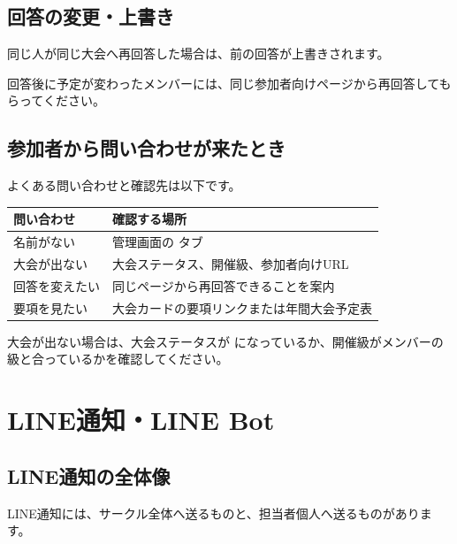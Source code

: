 \documentclass[a4paper,11pt]{ltjsarticle}
\newcommand{\code}[1]{\tcbox[
  on line,
  boxsep=0.3mm,
  left=0.7mm,
  right=0.7mm,
  top=0.2mm,
  bottom=0.2mm,
  arc=0.7mm,
  colback=soft,
  colframe=soft
]{\ttfamily\small #1}}
\begin{document}
\subsection{回答の変更・上書き}

同じ人が同じ大会へ再回答した場合は、前の回答が上書きされます。

回答後に予定が変わったメンバーには、同じ参加者向けページから再回答してもらってください。

\subsection{参加者から問い合わせが来たとき}

よくある問い合わせと確認先は以下です。

\renewcommand{\arraystretch}{1.25}
\begin{tabularx}{\linewidth}{>{\raggedright\arraybackslash}X>{\raggedright\arraybackslash}X}
\toprule
\rowcolor{tablehead}
\textbf{問い合わせ} & \textbf{確認する場所} \\ \midrule
名前がない & 管理画面の \code{メンバー} タブ \\
大会が出ない & 大会ステータス、開催級、参加者向けURL \\
回答を変えたい & 同じページから再回答できることを案内 \\
要項を見たい & 大会カードの要項リンクまたは年間大会予定表 \\
\bottomrule
\end{tabularx}

大会が出ない場合は、大会ステータスが \code{active} になっているか、開催級がメンバーの級と合っているかを確認してください。

\section{LINE通知・LINE Bot}

\subsection{LINE通知の全体像}

LINE通知には、サークル全体へ送るものと、担当者個人へ送るものがあります。
\end{document}
